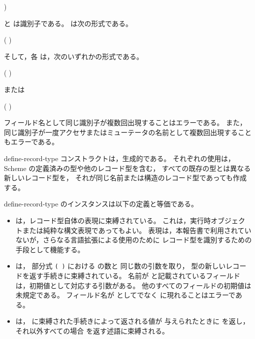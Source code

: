 \begin{entry}{%
)}

\syntax
{} と  は識別子である。
 は次の形式である。
\begin{scheme}
(  \dotsfoo)%
\end{scheme}
そして，各  は，次のいずれかの形式である。
\begin{scheme}
( )%
\end{scheme}
または
\begin{scheme}
(  )%
\end{scheme}

フィールド名として同じ識別子が複数回出現することはエラーである。
また，同じ識別子が一度アクセサまたはミューテータの名前として複数回出現することもエラーである。

{\cf define-record-type} コンストラクトは，生成的である。
それぞれの使用は，Scheme の定義済みの型や他のレコード型を含む，
すべての既存の型とは異なる新しいレコード型を，
それが同じ名前または構造のレコード型であっても作成する。

{\cf define-record-type} のインスタンスは以下の定義と等価である。

\begin{itemize}

\item {} は，レコード型自体の表現に束縛されている。
  これは，実行時オブジェクトまたは純粋な構文表現であってもよい。
  表現は，本報告書で利用されていないが，さらなる言語拡張による使用のために
  レコード型を識別するための手段として機能する。

\item {} は，
  部分式 \texttt{( \dotsfoo)} における  の数と
  同じ数の引数を取り， 型の新しいレコードを返す手続きに束縛されている。
  名前が  と記載されているフィールドは，初期値として対応する引数がある。
  他のすべてのフィールドの初期値は未規定である。
  フィールド名が  としてでなく  に現れることはエラーである。

\item {} は， に束縛された手続きによって返される値が
  与えられたときに \schtrue{} を返し，それ以外すべての場合 \schfalse{} を返す述語に束縛される。


\end{itemize}
\end{entry}
